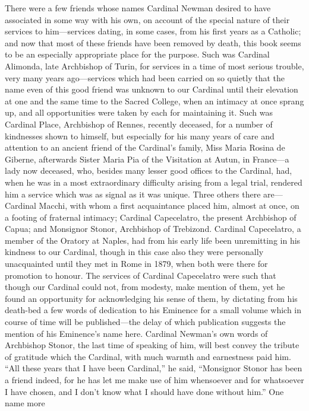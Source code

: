 There
were a few
friends whose names Cardinal Newman desired to have associated
in some
way with his own, on account of the special nature of their
services to
him—services dating, in some cases, from his first years as a
Catholic; and now that most of these friends have been removed
by death,
this book seems to be an especially appropriate place for the
purpose.
Such was Cardinal Alimonda, late Archbishop of Turin, for
services in a
time of most serious trouble, very many years ago—services which
had
been carried on so quietly that the name even of this good
friend was
unknown to our Cardinal until their elevation at one and the
same time
to the Sacred College, when an intimacy at once sprang up, and
all
opportunities were taken by each for maintaining it. Such was
Cardinal
Place, Archbishop of Rennes, recently deceased, for a number
of
kindnesses shown to himself, but especially for his many years
of care
and attention to an ancient friend of the Cardinal's family,
Miss
Maria Rosina de Giberne, afterwards Sister Maria Pia of the
Visitation
at Autun, in France—a lady now deceased, who, besides many
lesser good
offices to the Cardinal, had, when he was in a most
extraordinary
difficulty arising from a legal trial, rendered him a service
which was
as signal as it was unique. Three others there are—Cardinal
Macchi,
with whom a first acquaintance placed him, almost at once, on a
footing
of fraternal intimacy; Cardinal Capecelatro, the present
Archbishop of
Capua; and Monsignor Stonor, Archbishop of Trebizond. Cardinal
Capecelatro, a member of the Oratory at Naples, had from his
early life
been unremitting in his kindness to our Cardinal, though in this
case
also they were personally unacquainted until they met in Rome in
1879,
when both were there for promotion to honour. The services of
Cardinal
Capecelatro were such that though our Cardinal could not, from
modesty,
make mention of them, yet he found an opportunity for
acknowledging his
sense of them, by dictating from his death-bed a few words of
dedication
to his Eminence for a small volume which in course of time will
be
published—the delay of which publication suggests the mention of
his
Eminence's name here. Cardinal Newman's own words of Archbishop
Stonor, the last time of speaking of him, will best convey the
tribute
of gratitude which the Cardinal, with much warmth and
earnestness paid
him. ``All these years that I have been Cardinal,'' he said,
``Monsignor Stonor has been a friend indeed, for he has let me
make use of him whensoever and for whatsoever I have chosen, and
I
don't know what I should have done without him.'' One name more
